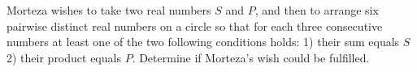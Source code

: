 Morteza wishes to take two real numbers $S$ and $P$, and then to arrange six pairwise distinct real numbers on a circle so that for each three consecutive numbers at least one of the two following conditions holds:
1) their sum equals $S$
2) their product equals $P$.
Determine if Morteza’s wish could be fulfilled.